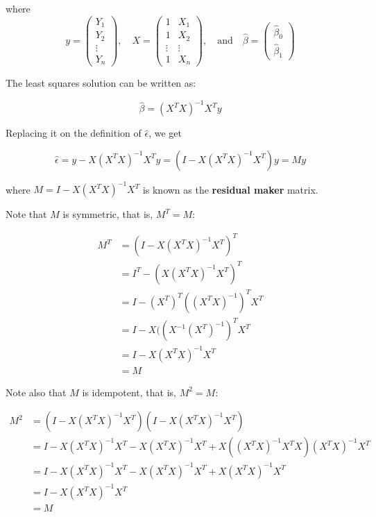 where \[
y = \begin{pmatrix}
Y_1 \\
Y_2 \\
\vdots \\
Y_n
\end{pmatrix}
, \quad
X = \begin{pmatrix}
1 & X_1 \\
1 & X_2 \\
\vdots & \vdots \\
1 & X_n
\end{pmatrix},
\quad \text{and} \quad
\hat{\beta} = \begin{pmatrix}
\hat{\beta}_0 \\
\hat{\beta}_1
\end{pmatrix}
\]

The least squares solution can be written as:

\[\hat{\beta} = (X^T X)^{-1} X^T y\]

Replacing it on the definition of \(\hat{\epsilon}\), we get

\[ \hat{\epsilon} = y - X (X^T X)^{-1} X^T y = (I - X (X^T X)^{-1} X^T) y = M y\]

where \(M = I - X (X^T X)^{-1} X^T\) is known as the \textbf{residual
maker} matrix.

Note that \(M\) is symmetric, that is, \(M^T = M\):

\begin{align}
M^T &= (I - X (X^T X)^{-1} X^T)^T  \\
&= I^T - (X (X^T X)^{-1} X^T)^T \\
&= I - (X^T)^T ((X^T X)^{-1})^T X^T \\
&= I - X ((X^{-1}(X^T)^{-1})^T X^T \\
&= I -  X (X^T X)^{-1} X^T \\
&= M
\end{align}

Note also that \(M\) is idempotent, that is, \(M^2 = M\):

\begin{align}
M^2 &= (I - X (X^T X)^{-1} X^T) (I - X (X^T X)^{-1} X^T) \\
&= I - X (X^T X)^{-1} X^T - X (X^T X)^{-1} X^T + X \left( (X^T X)^{-1} X^T X \right) (X^T X)^{-1} X^T \\
&= I - X (X^T X)^{-1} X^T - X (X^T X)^{-1} X^T + X (X^T X)^{-1} X^T \\
&= I - X (X^T X)^{-1} X^T \\
&= M
\end{align}

